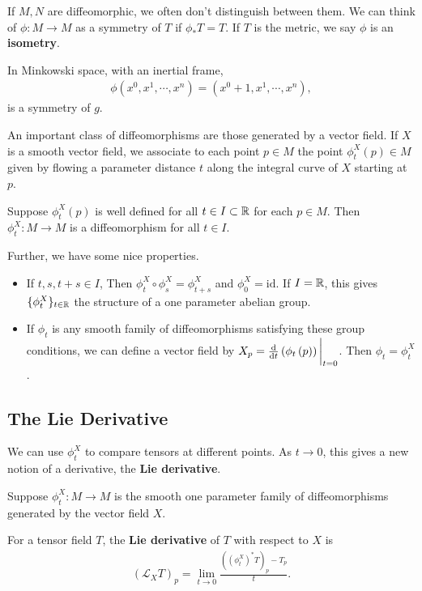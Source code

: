 If $M, N$ are diffeomorphic, we often don't distinguish between them. We can think of $\phi : M \to M$ as a symmetry of $T$ if $\phi_* T = T$. If $T$ is the metric, we say $\phi$ is an \textbf{isometry}.

\begin{example}
    In Minkowski space, with an inertial frame,
    \begin{align}
        \phi \left( x^{0}, x^{1},\cdots,x^{n} \right) = \left( x^{0} + 1, x^{1}, \cdots, x^{n} \right) 
    ,\end{align}
    is a symmetry of $g$.
\end{example}

An important class of diffeomorphisms are those generated by a vector field. If $X$ is a smooth vector field, we associate to each point $p \in M$ the point $\phi^{X}_t \left( p \right) \in M$ given by flowing a parameter distance $t$ along the integral curve of $X$ starting at $p$.

Suppose $\phi_t^{X}\left( p \right) $ is well defined for all $t \in I \subset \mathbb{R}$ for each $p \in M$. Then $\phi_t^{X} : M \to M$ is a diffeomorphism for all $t \in I$.

Further, we have some nice properties.
\begin{itemize}
    \item If $t,s,t+s \in I$, Then $\phi_t^{X} \circ \phi_s^{X} = \phi_{t + s}^{X}$ and $\phi_0^{X} = \text{id}$. If $I = \mathbb{R}$, this gives $\{\phi_t^{X}\}_{t \in \mathbb{R}}$ the structure of a one parameter abelian group.
    \item If $\phi_t$ is any smooth family of diffeomorphisms satisfying these group conditions, we can define a vector field by $X_p = \dv{t} \left( \phi_t \left( p \right)  \right) \bigg|_{t=0}$. Then $\phi_t = \phi_t^{X}$.
\end{itemize}


\subsection{The Lie Derivative}

We can use $\phi_t^{X}$ to compare tensors at different points. As $t \to 0$, this gives a new notion of a derivative, the \textbf{Lie derivative}.

Suppose $\phi_t^{X} : M \to M$ is the smooth one parameter family of diffeomorphisms generated by the vector field $X$.

\begin{definition}
    For a tensor field $T$, the \textbf{Lie derivative} of $T$ with respect to $X$ is
    \begin{align}
        \left( \mathcal{L}_X T \right)_p = \lim_{t \to 0} \frac{\left( \left( \phi_t^{X} \right)^{*} T \right)_p - T_p}{t}
    .\end{align}
\end{definition}

